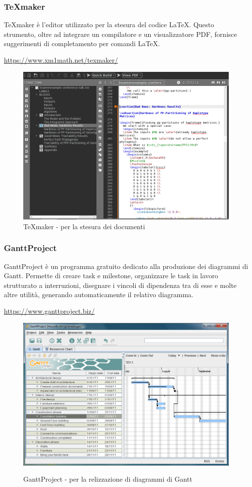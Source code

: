\subsubsection{\TeX{}maker}
\TeX{}maker è l'editor utilizzato per la stesura del codice \LaTeX{}. Questo strumento, oltre ad integrare un compilatore e un visualizzatore PDF, fornisce suggerimenti di completamento per comandi \LaTeX{}. \\
\centerline{\url{https://www.xm1math.net/texmaker/}}
\begin{figure}[H]
\centering
	\includegraphics[width=0.70\linewidth]{../Norme_di_progetto/img/texMaker.png}
	\caption{\TeX{}maker - per la stesura dei documenti}
\end{figure}

\subsubsection{GanttProject}
GanttProject è un programma gratuito dedicato alla produzione dei diagrammi di Gantt\glo. Permette di creare task e milestone\glo, organizzare le task in lavoro strutturato a interruzioni, disegnare
i vincoli di dipendenza tra di esse e molte altre utilità, generando automaticamente il relativo diagramma. \\
\centerline{\url{https://www.ganttproject.biz/}}
\begin{figure}[H]
	\centering
	\includegraphics[width=0.70\linewidth]{../Norme_di_progetto/img/gantt.png}\\
			\caption{GanttProject - per la relizzazione di diagrammi di Gantt}
\end{figure}

